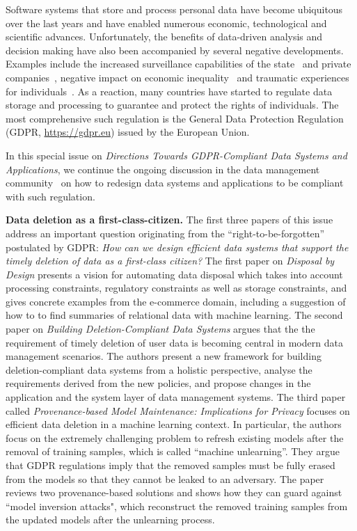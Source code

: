 \documentclass[11pt]{article}
\begin{document}
Software systems that store and process personal data have become ubiquitous over the last years and have enabled numerous economic, technological and scientific advances. Unfortunately, the benefits of data-driven analysis and decision making have also been accompanied by several negative developments. Examples include the increased surveillance capabilities of the state~\cite{noplacetohide} and private companies~\cite{surveillancecapitalism}, negative impact on economic inequality~\cite{automatinginequality} and traumatic experiences for individuals~\cite{beyondbroken}. As a reaction, many countries have started to regulate data storage and processing to guarantee and protect the rights of individuals. The most comprehensive such regulation is the 
General Data Protection Regulation (GDPR, {\footnotesize\url{https://gdpr.eu}}) issued by the European Union. 

In this special issue on {\em Directions Towards GDPR-Compliant Data Systems and Applications}, we continue the ongoing discussion in the data management community~\cite{gdpr-benchmark} on how to redesign data systems and applications to be compliant with such regulation. 


\vspace{0.1cm}
\noindent\textbf{Data deletion as a first-class-citizen.} The first three papers of this issue address an important question originating from the ``right-to-be-forgotten'' postulated by GDPR: {\em How can we design efficient data systems that support the timely deletion of data as a first-class citizen?} 
%
The first paper on {\em Disposal by Design} presents a vision for automating data disposal which takes into account processing constraints, regulatory constraints as well as storage constraints, and gives concrete examples from the e-commerce domain, including a suggestion of how to to find summaries of relational data with machine learning. 
%
The second paper on {\em Building Deletion-Compliant Data Systems} argues that the the requirement of timely deletion of user data is becoming central in modern data management scenarios. The authors present a new framework for building deletion-compliant data systems from a holistic perspective, analyse the requirements derived from the new policies, and propose changes in the application and the system layer of data management systems.
%
The third paper called {\em Provenance-based Model Maintenance: Implications for Privacy} focuses on efficient data deletion in a machine learning context. In particular, the authors focus on the extremely challenging problem to refresh existing models after the removal of training samples, which is called ``machine unlearning''. They argue that GDPR regulations imply that the removed samples must be fully erased from the models so that they cannot be leaked to an adversary. The paper reviews two provenance-based solutions and shows how they can guard against ``model inversion attacks", which reconstruct the removed training samples from the updated models after the unlearning process.
\end{document}
